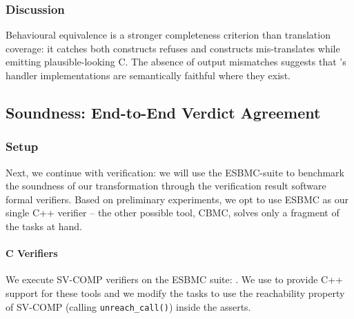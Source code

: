 \subsubsection{Discussion}

Behavioural equivalence is a stronger completeness criterion than translation coverage: it catches both constructs \toolcirc refuses and constructs \toolcirc mis-translates while emitting plausible-looking C. %
The absence of output mismatches suggests that \toolcirc's handler implementations are semantically faithful where they exist. %

\subsection{Soundness: End-to-End Verdict Agreement}\label{sec:eval-soundness}

\subsubsection{Setup}

Next, we continue with verification: we will use the ESBMC-suite to benchmark the soundness of our transformation through the verification result software formal verifiers. %
Based on preliminary experiments, we opt to use ESBMC as our single C++ verifier -- the other possible tool, CBMC, solves only a fragment of the tasks at hand. %

\paragraph{C Verifiers} %
We execute  SV-COMP verifiers on the ESBMC suite: . %
We use \toolcirc to provide C++ support for these tools and we modify the tasks to use the reachability property of SV-COMP (calling \texttt{unreach\_call()}) inside the asserts. %

